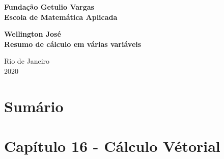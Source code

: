 \documentclass[12pt]{article}
\begin{document}
\begin{titlepage}
\begin{center}
\textbf{\LARGE Fundação Getulio Vargas}\\ 
\textbf{\LARGE Escola de Matemática Aplicada}

\par
\vspace{170pt}
\textbf{\Large Wellington José}\\
\vspace{32pt}
\textbf{\Large Resumo de cálculo em várias variáveis}\\
\end{center}

\par
\vfill
\begin{center}
{{\normalsize Rio de Janeiro}\\
{\normalsize 2020}}
\end{center}
\end{titlepage}

\section*{Sumário}

\textbf{}
\vspace{4mm}

\textbf{}
\vspace{4mm}

\textbf{}
\vspace{4mm}

\textbf{}
\vspace{4mm}

\textbf{}
\vspace{4mm}

\textbf{}
\vspace{4mm}

\textbf{}
\vspace{4mm}

\textbf{}
\vspace{4mm}

\textbf{}
\vspace{4mm}

\textbf{}
\vspace{4mm}

\textbf{}

\newpage

\section*{Capítulo 16 - Cálculo Vétorial}
\label{s1}
\end{document}
